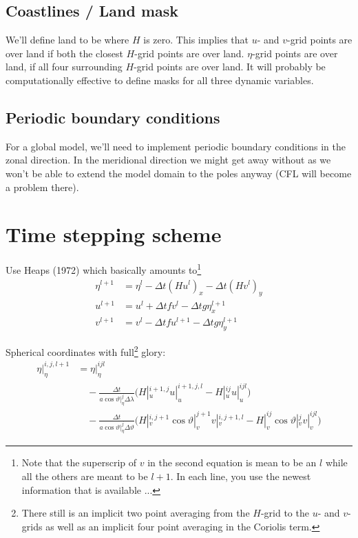 \documentclass[a4paper]{article}
\begin{document}
\subsection{Coastlines / Land mask}

We'll define land to be where $H$ is zero. This implies that $u$- and $v$-grid
points are over land if both the closest $H$-grid points are over land.
$\eta$-grid points are over land, if all four surrounding $H$-grid points are over land.
It will probably be computationally effective to define masks for all three dynamic variables.


\subsection{Periodic boundary conditions}

For a global model, we'll need to implement periodic boundary conditions in the zonal
direction.  In the meridional direction we might get away without as we won't be able 
to extend the model domain to the poles anyway (CFL will become a problem there).


\section{Time stepping scheme}

Use Heaps (1972) which basically amounts to\footnote{Note that the superscrip
of $v$ in the second equation is mean to be an $l$ while all the others are meant
to be $l+1$. In each line, you use the newest information that is available ...}
\begin{align}
  \eta^{l+1} & = \eta^l - \Delta t (Hu^l)_x - \Delta t (Hv^l)_y \\
  u^{l+1} & = u^l + \Delta t f v^l - \Delta t g \eta^{l+1}_x \\
  v^{l+1} & = v^l - \Delta t f u^{l+1} - \Delta t g \eta^{l+1}_y
\end{align}

Spherical coordinates with full\footnote{There still is an implicit two point
averaging from the $H$-grid to the $u$- and $v$-grids as well as an implicit
four point averaging in the Coriolis term.} glory:
\begin{equation}
  \begin{split}
    \eta|_\eta^{i,j,l+1} & = \eta|_\eta^{ijl} \\
    & \quad - \frac{\Delta t}{a\cos\vartheta|_\eta^{j}\Delta\lambda}
      \Biggl(H|_u^{i+1,j} u|_u^{i+1,j,l} - H|_u^{ij}u|_u^{ijl}\Biggr) \\
    & \quad - \frac{\Delta t}{a\cos\vartheta|_\eta^{j}\Delta\vartheta}  
      \Biggl(H|_v^{i,j+1}\cos\vartheta|_v^{j+1}v|_v^{i,j+1,l} - H|_v^{ij}\cos\vartheta|_v^{j}v|_v^{ijl}\Biggr)
  \end{split}
\end{equation}
\end{document}

